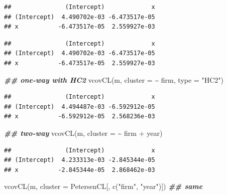 \documentclass[
]{book}
\newenvironment{Shaded}{\begin{snugshade}}{\end{snugshade}}
\newcommand{\AttributeTok}[1]{\textcolor[rgb]{0.77,0.63,0.00}{#1}}
\newcommand{\DocumentationTok}[1]{\textcolor[rgb]{0.56,0.35,0.01}{\textbf{\textit{#1}}}}
\newcommand{\FunctionTok}[1]{\textcolor[rgb]{0.00,0.00,0.00}{#1}}
\newcommand{\NormalTok}[1]{#1}
\newcommand{\SpecialCharTok}[1]{\textcolor[rgb]{0.00,0.00,0.00}{#1}}
\newcommand{\StringTok}[1]{\textcolor[rgb]{0.31,0.60,0.02}{#1}}
\theoremstyle{definition}
\theoremstyle{definition}
\theoremstyle{definition}
\theoremstyle{definition}
\theoremstyle{remark}
\begin{document}
\begin{verbatim}
##               (Intercept)             x
## (Intercept)  4.490702e-03 -6.473517e-05
## x           -6.473517e-05  2.559927e-03
\end{verbatim}

\begin{Shaded}
\end{Shaded}

\begin{verbatim}
##               (Intercept)             x
## (Intercept)  4.490702e-03 -6.473517e-05
## x           -6.473517e-05  2.559927e-03
\end{verbatim}

\begin{Shaded}
\begin{Highlighting}[]
\DocumentationTok{\#\# one{-}way with HC2}
\FunctionTok{vcovCL}\NormalTok{(m, }\AttributeTok{cluster =} \SpecialCharTok{\textasciitilde{}}\NormalTok{ firm, }\AttributeTok{type =} \StringTok{"HC2"}\NormalTok{)}
\end{Highlighting}
\end{Shaded}

\begin{verbatim}
##               (Intercept)             x
## (Intercept)  4.494487e-03 -6.592912e-05
## x           -6.592912e-05  2.568236e-03
\end{verbatim}

\begin{Shaded}
\begin{Highlighting}[]
\DocumentationTok{\#\# two{-}way}
\FunctionTok{vcovCL}\NormalTok{(m, }\AttributeTok{cluster =} \SpecialCharTok{\textasciitilde{}}\NormalTok{ firm }\SpecialCharTok{+}\NormalTok{ year)}
\end{Highlighting}
\end{Shaded}

\begin{verbatim}
##               (Intercept)             x
## (Intercept)  4.233313e-03 -2.845344e-05
## x           -2.845344e-05  2.868462e-03
\end{verbatim}

\begin{Shaded}
\begin{Highlighting}[]
\FunctionTok{vcovCL}\NormalTok{(m, }\AttributeTok{cluster =}\NormalTok{ PetersenCL[, }\FunctionTok{c}\NormalTok{(}\StringTok{"firm"}\NormalTok{, }\StringTok{"year"}\NormalTok{)]) }\DocumentationTok{\#\# same}
\end{Highlighting}
\end{Shaded}
\end{document}
